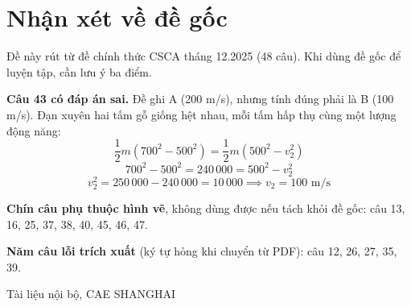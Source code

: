 \documentclass[11pt, a4paper]{article}
\begin{document}
\section{Nhận xét về đề gốc}

Đề này rút từ đề chính thức CSCA tháng 12.2025 (48 câu). Khi dùng đề gốc để luyện tập, cần lưu ý ba điểm.

\textbf{Câu 43 có đáp án sai.} Đề ghi A (200 m/s), nhưng tính đúng phải là B (100 m/s). Đạn xuyên hai tấm gỗ giống hệt nhau, mỗi tấm hấp thụ cùng một lượng động năng:
\[
\frac{1}{2}m(700^2 - 500^2) = \frac{1}{2}m(500^2 - v_2^2)
\]
\[
700^2 - 500^2 = 240\,000 = 500^2 - v_2^2
\]
\[
v_2^2 = 250\,000 - 240\,000 = 10\,000 \implies v_2 = 100 \text{ m/s}
\]

\textbf{Chín câu phụ thuộc hình vẽ}, không dùng được nếu tách khỏi đề gốc: câu 13, 16, 25, 37, 38, 40, 45, 46, 47.

\textbf{Năm câu lỗi trích xuất} (ký tự hỏng khi chuyển từ PDF): câu 12, 26, 27, 35, 39.

\vspace{0.8cm}
\begin{center}
{\footnotesize\color{cae_blue} Tài liệu nội bộ, CAE SHANGHAI}
\end{center}
\end{document}
